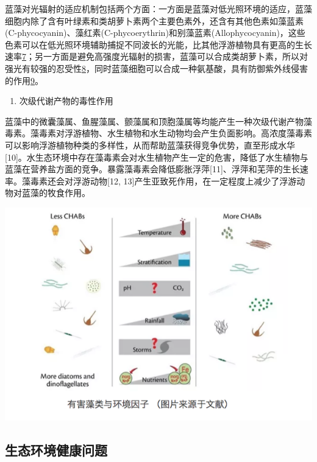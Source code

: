 \documentclass[
]{book}
\providecommand{\tightlist}{%
  \setlength{\itemsep}{0pt}\setlength{\parskip}{0pt}}
\begin{document}
蓝藻对光辐射的适应机制包括两个方面：一方面是蓝藻对低光照环境的适应，蓝藻细胞内除了含有叶绿素和类胡萝卜素两个主要色素外，还含有其他色素如藻蓝素(C-phycocyanin)、藻红素(C-phycoerythrin)和别藻蓝素(Allophycocyanin)，这些色素可以在低光照环境辅助捕捉不同波长的光能，比其他浮游植物具有更高的生长速率\href{Liu\%20R\%20L,\%20Liu\%20Y,\%20et\%20al.\%20Bioresourse\%20Technology\%202014,\%20154:\%20138.}{7}；另一方面是避免高强度光辐射的损害，蓝藻可以合成类胡萝卜素，所以对强光有较强的忍受性\href{Gao\%20F,Qu\%20J\%20Y,\%20et\%20al.\%20Electrochim.\%20Acta\%202016,\%20190:\%201134.}{8}，同时蓝藻细胞可以合成一种氨基酸，具有防御紫外线侵害的作用\href{Jiang\%20J,\%20Zhu\%20J\%20H,\%20et\%20al.\%20Energy\%20Environ.\%20Sci.\%202014,\%207:\%202670.}{9}。

\begin{enumerate}
\def\labelenumi{\arabic{enumi}.}
\setcounter{enumi}{4}
\tightlist
\item
  次级代谢产物的毒性作用
\end{enumerate}

蓝藻中的微囊藻属、鱼腥藻属、颤藻属和顶胞藻属等均能产生一种次级代谢产物藻毒素。藻毒素对浮游植物、水生植物和水生动物均会产生负面影响。高浓度藻毒素可以影响浮游植物种类的多样性，从而帮助蓝藻获得竞争优势，直至形成水华{[}10{]}。水生态环境中存在藻毒素会对水生植物产生一定的危害，降低了水生植物与蓝藻在营养盐方面的竞争。暴露藻毒素会降低膨胀浮萍{[}11{]}、浮萍和芜萍的生长速率。藻毒素还会对浮游动物{[}12, 13{]}产生亚致死作用，在一定程度上减少了浮游动物对蓝藻的牧食作用。

\includegraphics[width=8.33in]{images/lanzao2}

\hypertarget{ux751fux6001ux73afux5883ux5065ux5eb7ux95eeux9898}{%
\subsection{生态环境健康问题}\label{ux751fux6001ux73afux5883ux5065ux5eb7ux95eeux9898}}
\end{document}
